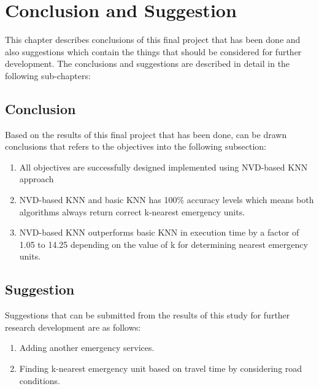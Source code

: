 \chapter{Conclusion and Suggestion}
This chapter describes conclusions of this final project that has been done and also suggestions which contain the things that should be considered for further development. The conclusions and suggestions are described in detail in the following sub-chapters:
\section{Conclusion}
Based on the results of this final project that has been done, can be drawn conclusions that refers to the objectives into the following subsection:
\begin{enumerate}
\item All objectives are successfully designed implemented using NVD-based KNN approach

\item NVD-based KNN and basic KNN has 100\% accuracy levels which means both algorithms always return correct k-nearest emergency units.

\item NVD-based KNN outperforms basic KNN in execution time by a factor of 1.05 to 14.25 depending on the value of k for determining nearest emergency units.
\end{enumerate}

\section{Suggestion}
Suggestions that can be submitted from the results of this study for further research development are as follows:
\begin{enumerate}
\item Adding another emergency services.
\item Finding k-nearest emergency unit based on travel time by considering road conditions.
\end{enumerate}
